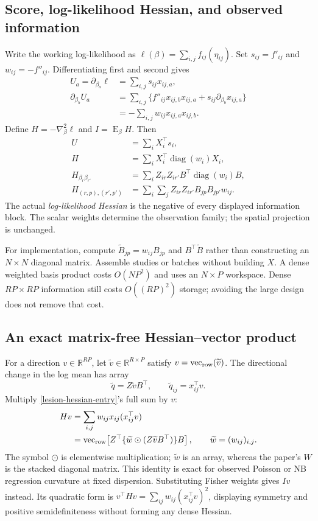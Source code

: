 \documentclass[11pt,a4paper]{article}
\newcommand{\R}{\mathbb R}
\newcommand{\E}{\operatorname{E}}
\newcommand{\diag}{\operatorname{diag}}
\newcommand{\vr}{\operatorname{vec}_{\rm row}}
\numberwithin{equation}{section}
\begin{document}
\subsection{Score, log-likelihood Hessian, and observed information}
Write the working log-likelihood as
$\ell(\beta)=\sum_{i,j}f_{ij}(\eta_{ij})$.
Set $s_{ij}=f'_{ij}$ and $w_{ij}=-f''_{ij}$.
Differentiating first and second gives
\begin{align}
 U_a=\partial_{\beta_a}\ell
 &=\sum_{i,j}s_{ij}x_{ij,a},\\
 \partial_{\beta_b}U_a
 &=\sum_{i,j}\{f''_{ij}x_{ij,b}x_{ij,a}
                +s_{ij}\partial_{\beta_b}x_{ij,a}\}\\
 &=-\sum_{i,j}w_{ij}x_{ij,a}x_{ij,b}.
\end{align}
Define $H=-\nabla_\beta^2\ell$ and $I=\E_\beta H$.
Then
\begin{align}
 U&=\sum_i X_i^\top s_i,\\
 H&=\sum_iX_i^\top\diag(w_i)X_i,\\
 H_{\beta_r\beta_{r'}}
 &=\sum_iZ_{ir}Z_{ir'}B^\top\diag(w_i)B,\\
 H_{(r,p),(r',p')}
 &=\sum_i\sum_jZ_{ir}Z_{ir'}B_{jp}B_{jp'}w_{ij}.
 \label{lesion-hessian-entry}
\end{align}
The actual \emph{log-likelihood Hessian} is the negative of every
displayed information block. The scalar weights determine the
observation family; the spatial projection is unchanged.

For implementation, compute $\widetilde B_{jp}=w_{ij}B_{jp}$
and $B^\top\widetilde B$ rather than constructing an $N\times N$
diagonal matrix. Assemble studies or batches without building $X$.
A dense weighted basis product costs $O(NP^2)$ and uses an $N\times P$
workspace. Dense $RP\times RP$ information still costs $O((RP)^2)$
storage; avoiding the large design does not remove that cost.

\subsection{An exact matrix-free Hessian--vector product}
For a direction $v\in\R^{RP}$, let
$\widetilde v\in\R^{R\times P}$ satisfy $v=\vr(\widetilde v)$.
The directional change in the log mean has array
\[
 \widetilde q=Z\widetilde v B^\top,\qquad
 \widetilde q_{ij}=x_{ij}^\top v.
\]
Multiply \eqref{lesion-hessian-entry}'s full sum by $v$:
\begin{align}
 Hv&=\sum_{i,j}w_{ij}x_{ij}(x_{ij}^\top v)\\
   &=\vr\!\left[
       Z^\top\{\widetilde w\mathbin{\odot}
                     (Z\widetilde v B^\top)\}B\right],
 \qquad \widetilde w=(w_{ij})_{i,j}.
 \label{lesion-hvp}
\end{align}
The symbol $\odot$ is elementwise multiplication; $\widetilde w$
is an array, whereas the paper's $W$ is the stacked diagonal
matrix. This identity is exact for observed Poisson or NB
regression curvature at fixed dispersion. Substituting Fisher
weights gives $Iv$ instead.
Its quadratic form is
$v^\top Hv=\sum_{ij}w_{ij}(x_{ij}^\top v)^2$, displaying symmetry
and positive semidefiniteness without forming any dense Hessian.
\end{document}
